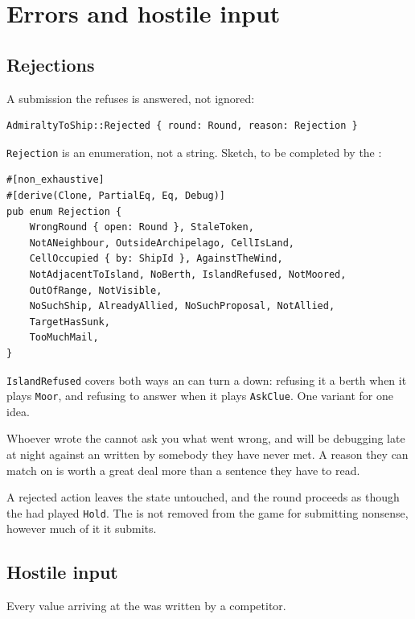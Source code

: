 \documentclass{article}
\begin{document}
\newpage
\section{Errors and hostile input}
\label{proto:errors}

\subsection{Rejections}

A submission the \chart{} refuses is answered, not ignored:

\begin{lstlisting}
AdmiraltyToShip::Rejected { round: Round, reason: Rejection }
\end{lstlisting}

\texttt{Rejection} is an enumeration, not a string. Sketch, to be completed by the \WG:

\begin{lstlisting}
#[non_exhaustive]
#[derive(Clone, PartialEq, Eq, Debug)]
pub enum Rejection {
    WrongRound { open: Round }, StaleToken,
    NotANeighbour, OutsideArchipelago, CellIsLand,
    CellOccupied { by: ShipId }, AgainstTheWind,
    NotAdjacentToIsland, NoBerth, IslandRefused, NotMoored,
    OutOfRange, NotVisible,
    NoSuchShip, AlreadyAllied, NoSuchProposal, NotAllied,
    TargetHasSunk,
    TooMuchMail,
}
\end{lstlisting}

\texttt{IslandRefused} covers both ways an \island{} can turn a \ship{} down: refusing it a berth
when it plays \texttt{Moor}, and refusing to answer when it plays \texttt{AskClue}. One variant
for one idea.

Whoever wrote the \ship{} cannot ask you what went wrong, and will be debugging late at night
against an \admiralty{} written by somebody they have never met. A reason they can match on is
worth a great deal more than a sentence they have to read.

A rejected action leaves the state untouched, and the round proceeds as though the \ship{} had
played \texttt{Hold}. The \ship{} is not removed from the game for submitting nonsense, however
much of it it submits.

\subsection{Hostile input}

Every value arriving at the \admiralty{} was written by a competitor.
\end{document}
